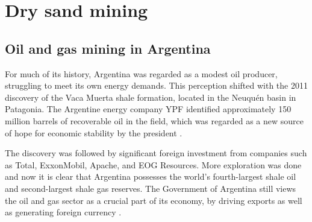 \chapter{Dry sand mining}



\section{Oil and gas mining in Argentina}
For much of its history, Argentina was regarded as a modest oil producer, struggling to meet its own energy demands. This perception shifted with the 2011 discovery of the Vaca Muerta shale formation, located in the Neuquén basin in Patagonia. The Argentine energy company YPF identified approximately 150 million barrels of recoverable oil in the field, which was regarded as a new source of hope for economic stability by the president \autocite{kraussArgentinaHopesBig2011}.

The discovery was followed by significant foreign investment from companies such as Total, ExxonMobil, Apache, and EOG Resources. More exploration was done and now it is clear that Argentina possesses the world’s fourth-largest shale oil and second-largest shale gas reserves. The Government of Argentina still views the oil and gas sector as a crucial part of its economy, by driving exports as well as generating foreign currency \autocite{internationaltradeadministrationArgentinaCountryCommercial2025}.

